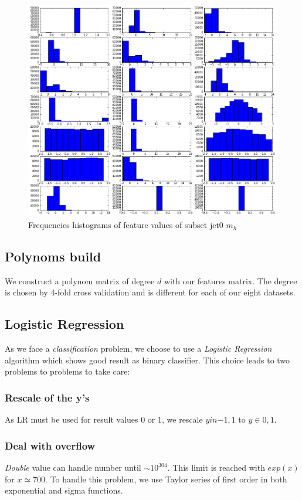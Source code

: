 \documentclass[10pt,conference,compsocconf]{IEEEtran}
\begin{document}
\begin{figure}[tbp] %
  \centering
  \includegraphics[width=\columnwidth]{img/features.png}
  \caption{Frequencies histograms of feature values of subset jet0 $m_h$}
  \vspace{-3mm}
  \label{hist}
\end{figure}


\subsection{Polynoms build}
We construct a polynom matrix of degree $d$ with our features matrix. The degree is chosen by 4-fold cross validation and is different for each of our eight datasets.

\subsection{Logistic Regression}
As we face a \emph{classification} problem, we choose to use a \emph{Logistic Regression} algorithm which shows good result as binary classifier. \cite{LRcourse} This choice leads to two problems to problems to take care:
\subsubsection{Rescale of the y's} 
As LR must be used for result values 0 or 1, we rescale $y in {-1, 1}$ to $y \in {0, 1}$. 

\subsubsection{Deal with overflow}
\emph{Double} value can handle number until $\sim 10^{304}$. This limit is reached with $exp(x)$ for $x \simeq 700$. To handle this problem, we use Taylor series of first order in both exponential and sigma functions. \cite{overflow}
\end{document}

